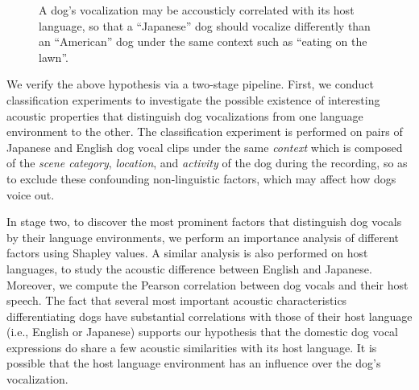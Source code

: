 \begin{figure}[th]
	\centering
	\caption{%
A dog's vocalization may be accousticly correlated with its host language, 
so that a ``Japanese'' dog should vocalize differently than an ``American''
dog under the same context such as ``eating on the lawn''.}
\label{fig:intropic}
\end{figure}

We verify the above hypothesis via a two-stage pipeline. 
First, we conduct classification experiments to investigate the possible
existence of interesting acoustic properties that distinguish dog vocalizations from one language environment to the other. The classification experiment is 
performed on pairs of Japanese and English dog vocal clips under the same \textit{context} which is composed of the \textit{scene category}, \textit{location}, and \textit{activity} of the dog during the recording, so as to exclude  
these confounding non-linguistic factors, which may affect how dogs voice out. 

In stage two, to discover the most prominent factors that distinguish dog vocals 
by their language environments, we perform an importance analysis of different 
factors using Shapley values. A similar analysis is also performed on host 
languages, to study the acoustic difference between English and Japanese. 
Moreover, we compute the Pearson correlation between dog vocals and their host 
speech.  The fact that several most important acoustic characteristics differentiating dogs
have substantial correlations with those of their host language 
(i.e., English or Japanese) supports our hypothesis that 
the domestic dog vocal expressions do share a few acoustic similarities 
with its host language. It is possible that the host language environment has 
an influence over the dog's vocalization. 

